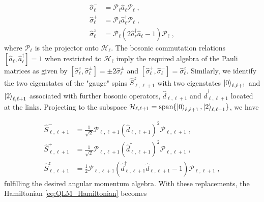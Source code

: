 \documentclass[aps,prl,twocolumn,superscriptaddress,footinbib,linenumbers]{revtex4}
\begin{document}
\begin{subequations}
\begin{align}
	\hat{\sigma}_\ell^{-} &= \mathcal{P}_\ell \hat{a}_\ell \mathcal{P}_\ell\; ,\\
	\hat{\sigma}_\ell^{+} &= \mathcal{P}_\ell\hat{a}^{\dagger}_\ell \mathcal{P}_\ell\; ,\\
	\hat{\sigma}^z_\ell &= \mathcal{P}_\ell\left(2\hat{a}_\ell^{\dagger}\hat{a}_\ell - 1\right)\mathcal{P}_\ell  \; ,
\end{align}
\end{subequations}
where $\mathcal{P}_\ell$ is the projector onto $\mathcal{H}_\ell$. The bosonic commutation relations $[\hat{a}_\ell,\hat{a}^{\dagger}_\ell] = 1$ when restricted to $\mathcal{H}_\ell$ imply the required algebra of the Pauli matrices as given by $[\hat{\sigma}^{z}_\ell,\hat{\sigma}^{\pm}_\ell] = \pm 2\hat{\sigma}^{\pm}_\ell$ and $[\hat{\sigma}^{+}_\ell,\hat{\sigma}^{-}_\ell] =  \hat{\sigma}^{z}_\ell$. Similarly, we identify the two eigenstates of the "gauge" spins $\hat{S}^z_{\ell,\ell+1}$ with two eigenstates $\ket{0}_{\ell,\ell+1}$ and $\ket{2}_{\ell,\ell+1}$ associated with further bosonic operators, $\hat{d}_{\ell,\ell+1}$ and $\hat{d}_{\ell,\ell+1}^{\dagger}$ located at the links. Projecting to the subspace $\mathcal{H}_{\ell,\ell+1} = \text{span}\{\ket{0}_{\ell,\ell+1},\ket{2}_{\ell,\ell+1}\}$, we have

\begin{subequations}
\begin{align}
\label{eq:S_minus}
\hat{S}^{-}_{\ell,\ell+1} &= \frac{1}{\sqrt{2}}\mathcal{P}_{\ell,\ell+1} \left(\hat{d}_{\ell,\ell+1}\right)^2 \mathcal{P}_{\ell,\ell+1}\; ,\\
\hat{S}^{+}_{\ell,\ell+1} &= \frac{1}{\sqrt{2}}\mathcal{P}_{\ell,\ell+1}\left(\hat{d}^{\dagger}_{\ell,\ell+1}\right)^2 \mathcal{P}_{\ell,\ell+1}\; ,\\
\hat{S}^{z}_{\ell,\ell+1} &= \frac{1}{2}\mathcal{P}_{\ell,\ell+1}\left(\hat{d}_{\ell,\ell+1}^{\dagger}\hat{d}_{\ell,\ell+1} - 1\right)\mathcal{P}_{\ell,\ell+1}  \; ,
\end{align}
\end{subequations}
fulfilling the desired angular momentum algebra. With these replacements, the Hamiltonian \ref{eq:QLM_Hamiltonian} becomes
\end{document}
